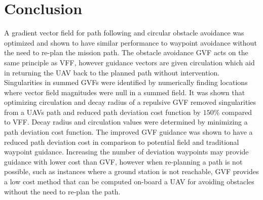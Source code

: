 \documentclass[conf]{new-aiaa}
\begin{document}
\section{Conclusion}
A gradient vector field for path following and circular obstacle avoidance was optimized and shown to have similar performance to waypoint avoidance without the need to re-plan the mission path. The obstacle avoidance GVF acts on the same principle as VFF, however guidance vectors are given circulation which aid in returning the UAV back to the planned path without intervention. Singularities in summed GVFs were identified by numerically finding locations where vector field magnitudes were null in a summed field. It was shown that optimizing circulation and decay radius of a repulsive GVF removed singularities from a UAVs path and reduced path deviation cost function by $150\%$ compared to VFF. Decay radius and circulation values were determined by minimizing a path deviation cost function. The improved GVF guidance was shown to have a reduced path deviation cost in comparison to potential field and traditional waypoint guidance. Increasing the number of deviation waypoints may provide guidance with lower cost than GVF, however when re-planning a path is not possible, such as instances where a ground station is not reachable, GVF provides a low cost method that can be computed on-board a UAV for avoiding obstacles without the need to re-plan the path. 



%
%
%
%
%


\end{document}
